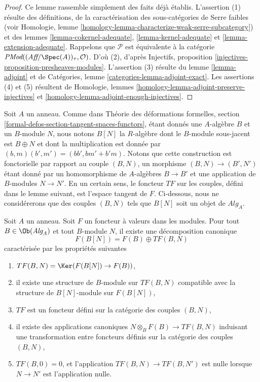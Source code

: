 \begin{proof}
Ce lemme rassemble simplement des faits déjà établis.
L'assertion (1) résulte des définitions, de la caractérisation des
sous-catégories de Serre faibles (voir
Homologie, lemme \ref{homology-lemma-characterize-weak-serre-subcategory})
et des
lemmes \ref{lemma-cokernel-adequate}, \ref{lemma-kernel-adequate}
et \ref{lemma-extension-adequate}.
Rappelons que $\mathcal{P}$ est équivalente à la catégorie
$\textit{PMod}((\textit{Aff}/\Spec(A))_\tau, \mathcal{O})$.
D'où (2), d'après
Injectifs, proposition \ref{injectives-proposition-presheaves-modules}.
L'assertion (3) résulte du
lemme \ref{lemma-adjoint}
et de
Catégories, lemme \ref{categories-lemma-adjoint-exact}.
Les assertions (4) et (5) résultent de
Homologie, lemmes \ref{homology-lemma-adjoint-preserve-injectives} et
\ref{homology-lemma-adjoint-enough-injectives}.
\end{proof}

\noindent
Soit $A$ un anneau. Comme dans
Théorie des déformations formelles, section
\ref{formal-defos-section-tangent-spaces-functors},
étant donnés une $A$-algèbre $B$ et un $B$-module $N$, nous notons $B[N]$
la $R$-algèbre dont le $B$-module sous-jacent est $B \oplus N$ et dont la multiplication
est donnée par $(b, m)(b', m ') = (bb', bm' + b'm)$. Notons que cette construction
est fonctorielle par rapport au couple $(B, N)$, un morphisme $(B, N) \to (B', N')$
étant donné par un homomorphisme de $A$-algèbres $B \to B'$ et une application de $B$-modules
$N \to N'$. En un certain sens, le foncteur $TF$ sur les couples, défini dans le lemme
suivant, est l'espace tangent de $F$.
Ci-dessous, nous ne considérerons que des couples $(B, N)$ tels que
$B[N]$ soit un objet de $\textit{Alg}_A$.

\begin{lemma}
\label{lemma-tangent-functor}
Soit $A$ un anneau. Soit $F$ un foncteur à valeurs dans les modules.
Pour tout $B \in \Ob(\textit{Alg}_A)$ et tout $B$-module $N$,
il existe une décomposition canonique
$$
F(B[N]) = F(B) \oplus TF(B, N)
$$
caractérisée par les propriétés suivantes
\begin{enumerate}
\item $TF(B, N) = \Ker(F(B[N]) \to F(B))$,
\item il existe une structure de $B$-module sur $TF(B, N)$
compatible avec la structure de $B[N]$-module sur $F(B[N])$,
\item $TF$ est un foncteur défini sur la catégorie des couples $(B, N)$,
\item
\label{item-mult-map}
il existe des applications canoniques $N \otimes_B F(B) \to TF(B, N)$
induisant une transformation entre foncteurs définis sur la catégorie
des couples $(B, N)$,
\item $TF(B, 0) = 0$, et l'application $TF(B, N) \to TF(B, N')$ est
nulle lorsque $N \to N'$ est l'application nulle.
\end{enumerate}
\end{lemma}

